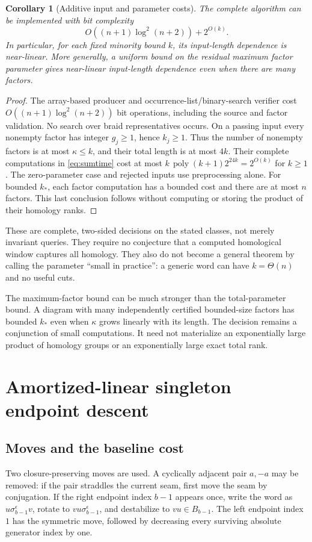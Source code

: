 \documentclass[11pt,letterpaper]{article}
\newtheorem{corollary}[theorem]{Corollary}
\theoremstyle{definition}
\newcommand{\poly}{\operatorname{poly}}
\begin{document}
\begin{corollary}[Additive input and parameter costs]
\label{cor:additive}
The complete algorithm can be implemented with bit complexity
\[
 O((n+1)\log^2(n+2))+2^{O(k)}.
\]
In particular, for each fixed minority bound $k$, its input-length dependence is near-linear. More generally, a uniform bound on the residual maximum factor parameter gives near-linear input-length dependence even when there are many factors.
\end{corollary}
\begin{proof}
The array-based producer and occurrence-list/binary-search verifier cost $O((n+1)\log^2(n+2))$ bit operations, including the source and factor validation. No search over braid representatives occurs. On a passing input every nonempty factor has integer $g_j\ge1$, hence $k_j\ge1$. Thus the number of nonempty factors is at most $\kappa\le k$, and their total length is at most $4k$. Their complete computations in \eqref{eq:sumtime} cost at most $k\,\poly(k+1)2^{24k}=2^{O(k)}$ for $k\ge1$. The zero-parameter case and rejected inputs use preprocessing alone. For bounded $k_*$, each factor computation has a bounded cost and there are at most $n$ factors. This last conclusion follows without computing or storing the product of their homology ranks.
\end{proof}

These are complete, two-sided decisions on the stated classes, not merely invariant queries. They require no conjecture that a computed homological window captures all homology. They also do not become a general theorem by calling the parameter ``small in practice'': a generic word can have $k=\Theta(n)$ and no useful cuts.

The maximum-factor bound can be much stronger than the total-parameter bound. A diagram with many independently certified bounded-size factors has bounded $k_*$ even when $\kappa$ grows linearly with its length. The decision remains a conjunction of small computations. It need not materialize an exponentially large product of homology groups or an exponentially large exact total rank.

\section{Amortized-linear singleton endpoint descent}
\label{sec:descent}

\subsection{Moves and the baseline cost}
Two closure-preserving moves are used. A cyclically adjacent pair $a,-a$ may be removed: if the pair straddles the current seam, first move the seam by conjugation. If the right endpoint index $b-1$ appears once, write the word as $u\sigma_{b-1}^{\epsilon}v$, rotate to $vu\sigma_{b-1}^{\epsilon}$, and destabilize to $vu\in B_{b-1}$. The left endpoint index $1$ has the symmetric move, followed by decreasing every surviving absolute generator index by one.
\end{document}
